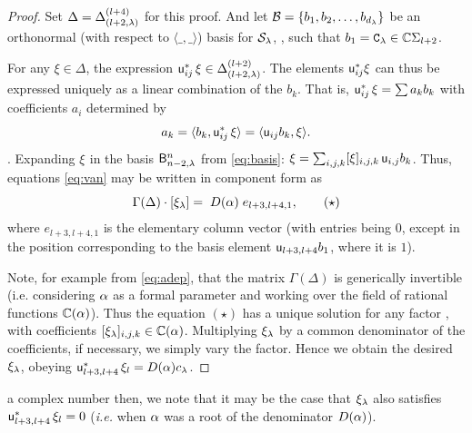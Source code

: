 \begin{proof} 
Set $\Delta=\Delta^{(l+4)}_{(l+2,\lambda)}$ for this proof. 
And let $\mathcal{B}=\{b_1,b_2,\dots, b_{d_\lambda}\}$ be an orthonormal (with respect to $\langle\_,\_\rangle$) basis for $\mathcal{S}_\lambda$, 
, 
such that 
$b_1= {\mathtt{C}}_\lambda \in \mathbb{C} \Sigma_{l+2}$.  

For any $\xi \in \Delta$, the expression 
${\mathsf u}_{ij}^* \, \xi \in \Delta^{(l+2)}_{(l+2,\lambda)}$. 
The elements ${\mathsf u}_{ij}^* \xi$ can thus be expressed  %
uniquely as a linear combination of the $b_k$. That is,  ${\mathsf u}_{ij}^* \, \xi=\sum a_k b_k$ with coefficients $a_i$ determined by
\[  
a_k  =  \langle b_k, {\mathsf u}_{ij}^* \, \xi \rangle  =   \langle {\mathsf u}_{ij} b_k, \xi \rangle. 
\]
.
Expanding $\xi_{}$ in the basis ${\mathsf B}^n_{n-2,\lambda}$ from \eqref{eq:basis}:
$\xi_{}=\sum_{i,j,k} [\xi_{}]_{i,j,k} \, {\mathsf u}_{i,j} b_k$.  
Thus, 
equations \eqref{eq:van} 
may be written in component form as
\[ 
\Gamma(\Delta) \cdot [\xi_{\lambda}] = \; D(\alpha) \;  e_{l+3,l+4,1},  \tag{$\star$} \]
where $e_{l+3,l+4,1}$ is the elementary column vector 
(with entries being $0$, except in the position corresponding to the basis element ${\mathsf u}_{l+3,l+4} b_1$, where it is $1$). 

Note, for example from  \eqref{eq:adep}, 
that the matrix $
\Gamma(\Delta)$ is generically invertible (i.e. considering $\alpha$ as a formal parameter and working over the field of rational functions $\mathbb{C}(\alpha)$). Thus the equation $(\star)$ has a unique solution 
for any factor , 
with coefficients $[\xi_{\lambda}]_{i,j,k}\in \mathbb{C}(\alpha)$. 
Multiplying $\xi_\lambda$ by a common denominator  %
of the coefficients, if necessary, we 
simply vary the factor. Hence we 
obtain the desired $\xi_\lambda$, obeying ${\mathsf u}_{l+3,l+4}^* \, \xi_l=D(\alpha) c_\lambda$. 
\end{proof}


\mdef 
{}
a complex number then, we note that it may be the case that $\xi_\lambda$ also satisfies ${\mathsf u}_{l+3,l+4}^* \, \xi_l=0$ (\textit{i.e.} when $\alpha$ was a root of the denominator $D(\alpha)$).

